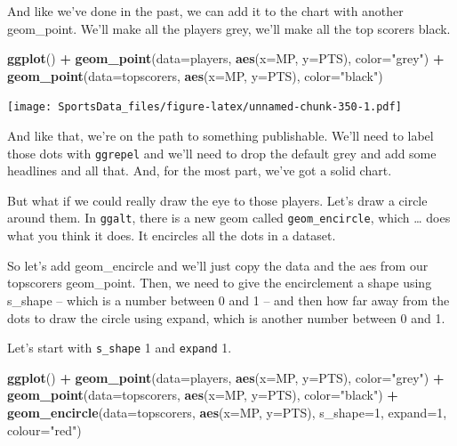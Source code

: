 \documentclass[
]{book}
\newenvironment{Shaded}{\begin{snugshade}}{\end{snugshade}}
\newcommand{\DataTypeTok}[1]{\textcolor[rgb]{0.13,0.29,0.53}{#1}}
\newcommand{\DecValTok}[1]{\textcolor[rgb]{0.00,0.00,0.81}{#1}}
\newcommand{\KeywordTok}[1]{\textcolor[rgb]{0.13,0.29,0.53}{\textbf{#1}}}
\newcommand{\NormalTok}[1]{#1}
\newcommand{\OperatorTok}[1]{\textcolor[rgb]{0.81,0.36,0.00}{\textbf{#1}}}
\newcommand{\StringTok}[1]{\textcolor[rgb]{0.31,0.60,0.02}{#1}}
\begin{document}
And like we've done in the past, we can add it to the chart with another geom\_point. We'll make all the players grey, we'll make all the top scorers black.

\begin{Shaded}
\begin{Highlighting}[]
\KeywordTok{ggplot}\NormalTok{() }\OperatorTok{+}\StringTok{ }\KeywordTok{geom_point}\NormalTok{(}\DataTypeTok{data=}\NormalTok{players, }\KeywordTok{aes}\NormalTok{(}\DataTypeTok{x=}\NormalTok{MP, }\DataTypeTok{y=}\NormalTok{PTS), }\DataTypeTok{color=}\StringTok{"grey"}\NormalTok{) }\OperatorTok{+}\StringTok{ }\KeywordTok{geom_point}\NormalTok{(}\DataTypeTok{data=}\NormalTok{topscorers, }\KeywordTok{aes}\NormalTok{(}\DataTypeTok{x=}\NormalTok{MP, }\DataTypeTok{y=}\NormalTok{PTS), }\DataTypeTok{color=}\StringTok{"black"}\NormalTok{)}
\end{Highlighting}
\end{Shaded}

\texttt{[image: SportsData\_files/figure-latex/unnamed-chunk-350-1.pdf]}

And like that, we're on the path to something publishable. We'll need to label those dots with \texttt{ggrepel} and we'll need to drop the default grey and add some headlines and all that. And, for the most part, we've got a solid chart.

But what if we could really draw the eye to those players. Let's draw a circle around them.
In \texttt{ggalt}, there is a new geom called \texttt{geom\_encircle}, which \ldots{} does what you think it does. It encircles all the dots in a dataset.

So let's add geom\_encircle and we'll just copy the data and the aes from our topscorers geom\_point. Then, we need to give the encirclement a shape using s\_shape -- which is a number between 0 and 1 -- and then how far away from the dots to draw the circle using expand, which is another number between 0 and 1.

Let's start with \texttt{s\_shape} 1 and \texttt{expand} 1.

\begin{Shaded}
\begin{Highlighting}[]
\KeywordTok{ggplot}\NormalTok{() }\OperatorTok{+}\StringTok{ }
\StringTok{  }\KeywordTok{geom_point}\NormalTok{(}\DataTypeTok{data=}\NormalTok{players, }\KeywordTok{aes}\NormalTok{(}\DataTypeTok{x=}\NormalTok{MP, }\DataTypeTok{y=}\NormalTok{PTS), }\DataTypeTok{color=}\StringTok{"grey"}\NormalTok{) }\OperatorTok{+}\StringTok{ }
\StringTok{  }\KeywordTok{geom_point}\NormalTok{(}\DataTypeTok{data=}\NormalTok{topscorers, }\KeywordTok{aes}\NormalTok{(}\DataTypeTok{x=}\NormalTok{MP, }\DataTypeTok{y=}\NormalTok{PTS), }\DataTypeTok{color=}\StringTok{"black"}\NormalTok{) }\OperatorTok{+}\StringTok{ }
\StringTok{  }\KeywordTok{geom_encircle}\NormalTok{(}\DataTypeTok{data=}\NormalTok{topscorers, }\KeywordTok{aes}\NormalTok{(}\DataTypeTok{x=}\NormalTok{MP, }\DataTypeTok{y=}\NormalTok{PTS), }\DataTypeTok{s_shape=}\DecValTok{1}\NormalTok{, }\DataTypeTok{expand=}\DecValTok{1}\NormalTok{, }\DataTypeTok{colour=}\StringTok{"red"}\NormalTok{)}
\end{Highlighting}
\end{Shaded}
\end{document}
